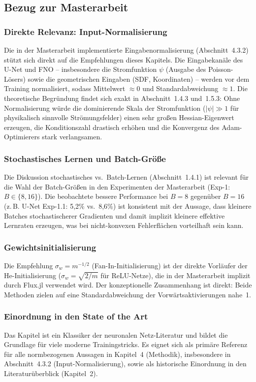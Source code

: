 \documentclass[a4paper,12pt]{article}
\begin{document}
\subsection*{Bezug zur Masterarbeit}

\subsubsection*{Direkte Relevanz: Input-Normalisierung}

Die in der Masterarbeit implementierte Eingabenormalisierung (Abschnitt~4.3.2) stützt sich direkt auf die Empfehlungen dieses Kapitels. Die Eingabekanäle des U-Net und FNO -- insbesondere die Stromfunktion $\psi$ (Ausgabe des Poisson-Lösers) sowie die geometrischen Eingaben (SDF, Koordinaten) -- werden vor dem Training normalisiert, sodass Mittelwert $\approx 0$ und Standardabweichung $\approx 1$. Die theoretische Begründung findet sich exakt in Abschnitt~1.4.3 und~1.5.3: Ohne Normalisierung würde die dominierende Skala der Stromfunktion ($|\psi| \gg 1$ für physikalisch sinnvolle Strömungsfelder) einen sehr großen Hessian-Eigenwert erzeugen, die Konditionszahl drastisch erhöhen und die Konvergenz des Adam-Optimierers stark verlangsamen.

\subsubsection*{Stochastisches Lernen und Batch-Größe}

Die Diskussion stochastisches vs.\ Batch-Lernen (Abschnitt~1.4.1) ist relevant für die Wahl der Batch-Größen in den Experimenten der Masterarbeit (Exp-1: $B \in \{8, 16\}$). Die beobachtete bessere Performance bei $B=8$ gegenüber $B=16$ (z.\,B. U-Net Exp-1.1: 5{,}2\% vs.\ 8{,}6\%) ist konsistent mit der Aussage, dass kleinere Batches stochastischerer Gradienten und damit implizit kleinere effektive Lernraten erzeugen, was bei nicht-konvexen Fehlerflächen vorteilhaft sein kann.

\subsubsection*{Gewichtsinitialisierung}

Die Empfehlung $\sigma_w = m^{-1/2}$ (Fan-In-Initialisierung) ist der direkte Vorläufer der He-Initialisierung ($\sigma_w = \sqrt{2/m}$ für ReLU-Netze), die in der Masterarbeit implizit durch Flux.jl verwendet wird. Der konzeptionelle Zusammenhang ist direkt: Beide Methoden zielen auf eine Standardabweichung der Vorwärtsaktivierungen nahe~1.

\subsubsection*{Einordnung in den State of the Art}

Das Kapitel ist ein Klassiker der neuronalen Netz-Literatur und bildet die Grundlage für viele moderne Trainingstricks. Es eignet sich als primäre Referenz für alle normbezogenen Aussagen in Kapitel~4 (Methodik), insbesondere in Abschnitt~4.3.2 (Input-Normalisierung), sowie als historische Einordnung in den Literaturüberblick (Kapitel~2).
\end{document}
